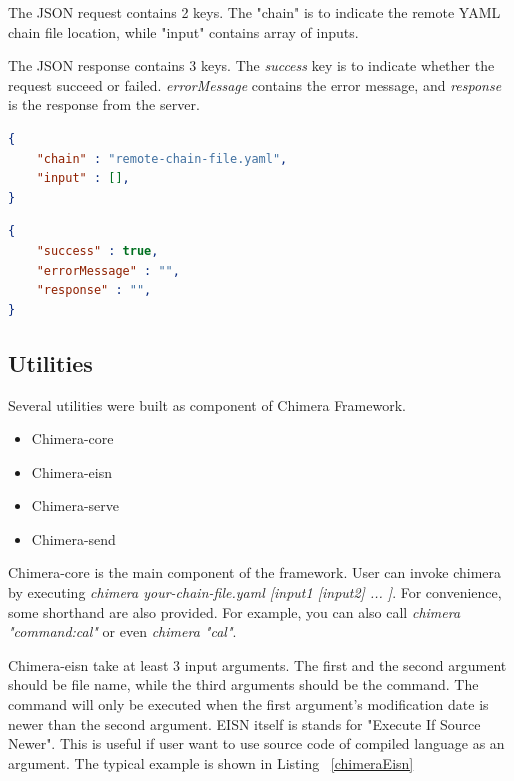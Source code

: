 \documentclass[conference]{IEEEtran}
\begin{document}
The JSON request contains 2 keys. The "chain" is to 
indicate the remote YAML chain file location, while "input" contains array of inputs.

The JSON response contains 3 keys. The {\it success} key is to indicate
whether the request succeed or failed. {\it errorMessage} contains the error message, and
{\it response} is the response from the server.

\begin{lstlisting}[caption=JSON Request, label=jsonRequest, language=json, basicstyle=\small, breaklines=true] 
{
    "chain" : "remote-chain-file.yaml",
    "input" : [],
}
\end{lstlisting}

\begin{lstlisting}[caption=JSON Response, label=jsonResponse, language=json, basicstyle=\small, breaklines=true]
{
    "success" : true,
    "errorMessage" : "",
    "response" : "",
}
\end{lstlisting}


\subsection{Utilities}

Several utilities were built as component of Chimera Framework.

\begin{itemize}
    \item Chimera-core
    \item Chimera-eisn
    \item Chimera-serve
    \item Chimera-send
\end{itemize}

Chimera-core is the main component of the framework. User can invoke chimera by
executing {\it chimera your-chain-file.yaml [input1 [input2] ... ]}. For convenience,
some shorthand are also provided. For example, you can also call 
{\it chimera "command:cal"} or even {\it chimera "cal"}.

Chimera-eisn take at least 3 input arguments. The first and the second argument should
be file name, while the third arguments should be the command. The command will only
be executed when the first argument's modification date is newer than the second 
argument. EISN itself is stands for "Execute If Source Newer". This is useful if user
want to use source code of compiled language as an argument. 
The typical example is shown in Listing ~\ref{chimeraEisn}
\end{document}
